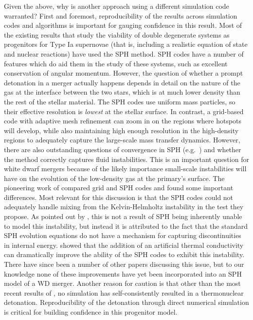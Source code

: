 \documentclass[iop]{emulateapj}
\begin{document}
Given the above, why is another approach using a different simulation
code warranted? First and foremost, reproducibility of the results
across simulation codes and algorithms is important for gauging
confidence in this result. Most of the existing results that study 
the viability of double degenerate systems as progenitors for
Type Ia supernovae (that is, including a realistic 
equation of state and nuclear reactions) have
used the SPH method. SPH codes have a number of features which do aid
them in the study of these systems, such as excellent conservation of
angular momentum. However, the question of whether a prompt detonation
in a merger actually happens depends in detail on the nature of the
gas at the interface between the two stars, which is at much lower
density than the rest of the stellar material. The SPH codes use
uniform mass particles, so their effective resolution is
\textit{lowest} at the stellar surface. In contrast, a grid-based code
with adaptive mesh refinement can zoom in on the regions where
hotspots will develop, while also maintaining high enough resolution
in the high-density regions to adequately capture the large-scale mass
transfer dynamics. However, there are also outstanding questions of
convergence in SPH (e.g.\ \citealt{zhu_SPH:2014}) and whether the method
correctly captures fluid instabilities. This is an important question
for white dwarf mergers because of the likely importance small-scale
instabilities will have on the evolution of the low-density gas at the
primary's surface. The pioneering work of \cite{agertz:2007} compared
grid and SPH codes and found some important differences. Most relevant
for this discussion is that the SPH codes could not adequately handle
mixing from the Kelvin-Helmholtz instability in the test they
propose. As pointed out by \cite{price:2008}, this is not a result of
SPH being inherently unable to model this instability, but instead it
is attributed to the fact that the standard SPH evolution equations do
not have a mechanism for capturing discontinuities in internal
energy. \citeauthor{price:2008} showed that the addition of an
artificial thermal conductivity can dramatically improve the ability
of the SPH codes to exhibit this instability. There have since been a
number of other papers discussing this issue, but to our knowledge
none of these improvements have yet been incorporated into an SPH
model of a WD merger. Another reason for caution is that other than the
most recent results of \cite{kashyap:2015}, no simulation has self-consistently
resulted in a thermonuclear detonation. Reproducibility of the detonation 
through direct numerical simulation is critical for building 
confidence in this progenitor model.
\end{document}
